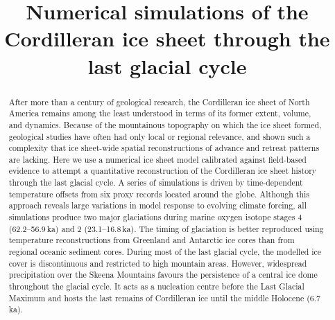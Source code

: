 \documentclass[tc, manuscript]{copernicus}
\begin{document}
\hack{\sloppy}


\title{Numerical simulations of the Cordilleran ice sheet
       through the last glacial cycle}







\hack{\allowdisplaybreaks}

\published{}


\maketitle


\begin{abstract}
After more than a century of geological research, the Cordilleran
ice sheet of North America remains among the least understood in
terms of its former extent, volume, and dynamics. Because of the
mountainous topography on which the ice sheet formed, geological
studies have often had only local or regional relevance, and shown
such a complexity that ice sheet-wide spatial reconstructions of
advance and retreat patterns are
lacking. Here we use a numerical ice sheet model calibrated against
field-based evidence to attempt a quantitative reconstruction of the
Cordilleran ice sheet history through the last glacial
cycle. A series of simulations is driven by time-dependent
temperature offsets from six proxy records located around the
globe. Although this approach reveals large variations in model
response to evolving climate forcing, all simulations produce two
major glaciations during marine oxygen isotope stages 4
(62.2--56.9\,\unit{ka}) and 2 (23.1--16.8\,\unit{ka}). The timing of
glaciation is better reproduced using temperature reconstructions
from Greenland and Antarctic ice cores than from regional oceanic
sediment cores. During most of the last glacial cycle, the modelled
ice cover is discontinuous and restricted to high mountain
areas. However, widespread precipitation over the Skeena Mountains
favours the persistence of a central ice dome throughout the glacial
cycle. It acts as a nucleation centre before the Last Glacial
Maximum and hosts the last remains of Cordilleran ice until the
middle Holocene (6.7\,\unit{ka}).
\end{abstract}
\end{document}
